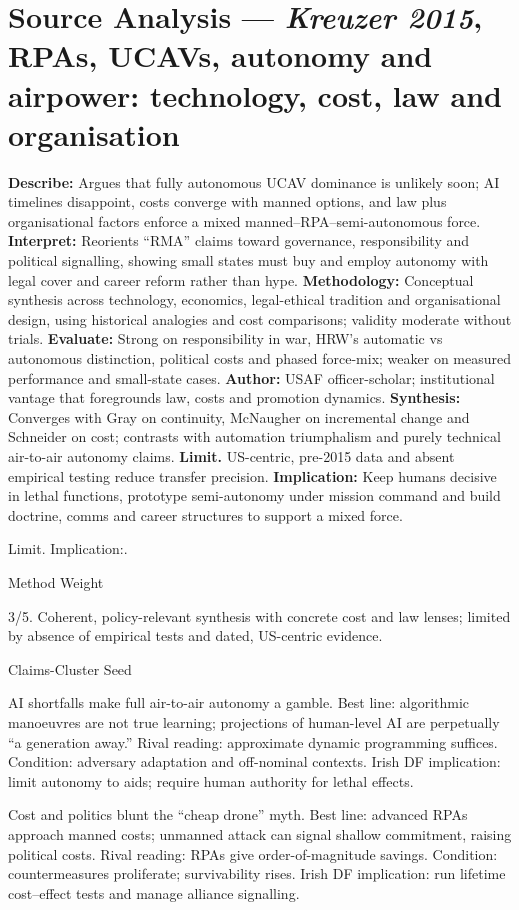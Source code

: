\section*{Source Analysis — \textit{Kreuzer 2015}, RPAs, UCAVs, autonomy and airpower: technology, cost, law and organisation}
\textbf{Describe:} Argues that fully autonomous UCAV dominance is unlikely soon; AI timelines disappoint, costs converge with manned options, and law plus organisational factors enforce a mixed manned–RPA–semi-autonomous force.
\textbf{Interpret:} Reorients “RMA” claims toward governance, responsibility and political signalling, showing small states must buy and employ autonomy with legal cover and career reform rather than hype.
\textbf{Methodology:} Conceptual synthesis across technology, economics, legal-ethical tradition and organisational design, using historical analogies and cost comparisons; validity moderate without trials.
\textbf{Evaluate:} Strong on responsibility in war, HRW’s automatic vs autonomous distinction, political costs and phased force-mix; weaker on measured performance and small-state cases.
\textbf{Author:} USAF officer-scholar; institutional vantage that foregrounds law, costs and promotion dynamics.
\textbf{Synthesis:} Converges with Gray on continuity, McNaugher on incremental change and Schneider on cost; contrasts with automation triumphalism and purely technical air-to-air autonomy claims.
\textbf{Limit.} US-centric, pre-2015 data and absent empirical testing reduce transfer precision.
\textbf{Implication:} Keep humans decisive in lethal functions, prototype semi-autonomy under mission command and build doctrine, comms and career structures to support a mixed force.

Limit. Implication:.

Method Weight

3/5. Coherent, policy-relevant synthesis with concrete cost and law lenses; limited by absence of empirical tests and dated, US-centric evidence.

Claims-Cluster Seed

AI shortfalls make full air-to-air autonomy a gamble.
Best line: algorithmic manoeuvres are not true learning; projections of human-level AI are perpetually “a generation away.”
Rival reading: approximate dynamic programming suffices.
Condition: adversary adaptation and off-nominal contexts.
Irish DF implication: limit autonomy to aids; require human authority for lethal effects.

Cost and politics blunt the “cheap drone” myth.
Best line: advanced RPAs approach manned costs; unmanned attack can signal shallow commitment, raising political costs.
Rival reading: RPAs give order-of-magnitude savings.
Condition: countermeasures proliferate; survivability rises.
Irish DF implication: run lifetime cost–effect tests and manage alliance signalling.

